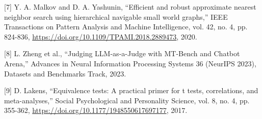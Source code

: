 \documentclass[10pt,a4paper,twocolumn]{article}
\begin{document}
{\noindent\hangindent=0.5cm
[7] Y. A. Malkov and D. A. Yashunin, ``Efficient and robust approximate nearest neighbor search using hierarchical navigable small world graphs,'' IEEE Transactions on Pattern Analysis and Machine Intelligence, vol. 42, no. 4, pp. 824-836, \url{https://doi.org/10.1109/TPAMI.2018.2889473}, 2020.
\par\vspace{0pt}

\noindent\hangindent=0.5cm
[8] L. Zheng et al., ``Judging LLM-as-a-Judge with MT-Bench and Chatbot Arena,'' Advances in Neural Information Processing Systems 36 (NeurIPS 2023), Datasets and Benchmarks Track, 2023.
\par\vspace{0pt}

\noindent\hangindent=0.5cm
[9] D. Lakens, ``Equivalence tests: A practical primer for t tests, correlations, and meta-analyses,'' Social Psychological and Personality Science, vol. 8, no. 4, pp. 355-362, \url{https://doi.org/10.1177/1948550617697177}, 2017.
\par
}
\end{document}
